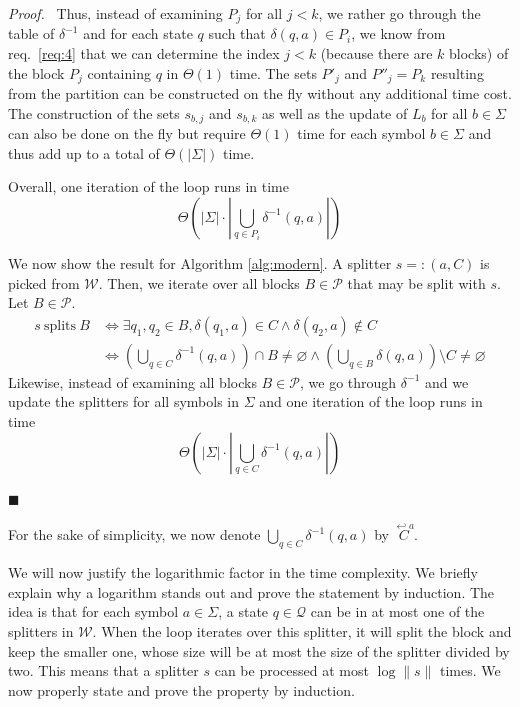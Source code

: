 \documentclass[12pt, a4 paper]{article}
\renewenvironment{proof}[1][Proof]{\begin{mdframed}[backgroundcolor=black!5, topline=false, rightline=false, bottomline=false, linecolor=black!15, linewidth=3pt]{\noindent\textit{#1.}\ }}{\noindent\par\hfill$\blacksquare$\end{mdframed}}
\theoremstyle{definition}
\begin{document}
\begin{proof}
    Thus, instead of examining $P_j$ for all $j < k$, we rather go through the table of $\delta^{-1}$ and for each state $q$ such that $\delta(q, a) \in P_i$, we know from req.\ \ref{req:4} that we can determine the index $j < k$ (because there are $k$ blocks) of the block $P_j$ containing $q$ in $\Theta(1)$ time.
    The sets $P'_j$ and $P''_j = P_k$ resulting from the partition can be constructed on the fly without any additional time cost. The construction of the sets $s_{b, j}$ and $s_{b, k}$ as well as the update of $L_b$ for all $b \in \Sigma$ can also be done on the fly but require $\Theta(1)$ time for each symbol $b \in \Sigma$ and thus add up to a total of $\Theta(\left| \Sigma \right|)$ time.

    Overall, one iteration of the loop runs in time
    $$\Theta \left( \left| \Sigma \right| \cdot \left| \bigcup_{q \in P_i} \delta^{-1}(q, a) \right| \right) $$

    \bigskip
    We now show the result for Algorithm \ref{alg:modern}. A splitter ${s =: (a, C)}$ is picked from $\mathcal{W}$.
    Then, we iterate over all blocks $B \in \mathcal{P}$ that may be split with $s$. Let $B \in \mathcal{P}$.
    \begin{align*}
        s\ \text{splits}\ B &\iff \exists q_1, q_2 \in B, \delta(q_1, a) \in C \land \delta(q_2, a) \notin C\\
        &\iff \left(\bigcup_{q \in C} \delta^{-1}(q, a)\right)\cap B \neq \varnothing \land \left(\bigcup_{q \in B}\delta(q, a)\right)\setminus C \neq \varnothing
    \end{align*}
    Likewise, instead of examining all blocks $B \in \mathcal{P}$, we go through $\delta^{-1}$ and we update the splitters for all symbols in $\Sigma$ and one iteration of the loop runs in time
    $$\Theta \left( \left| \Sigma \right| \cdot \left| \bigcup_{q \in C} \delta^{-1}(q, a) \right| \right) $$
\end{proof}

For the sake of simplicity, we now denote $\displaystyle{\bigcup_{q \in C} \delta^{-1}(q, a)}$ by $\overset{\hookleftarrow a}{C}$.

We will now justify the logarithmic factor in the time complexity.
We briefly explain why a logarithm stands out and prove the statement by induction.
The idea is that for each symbol $a \in \Sigma$, a state $q \in \mathcal{Q}$ can be in at most one of the splitters in $\mathcal{W}$.
When the loop iterates over this splitter, it will split the block and keep the smaller one, whose size will be at most the size of the splitter divided by two.
This means that a splitter $s$ can be processed at most $\log \| s \|$ times.
We now properly state and prove the property by induction.
\end{document}
